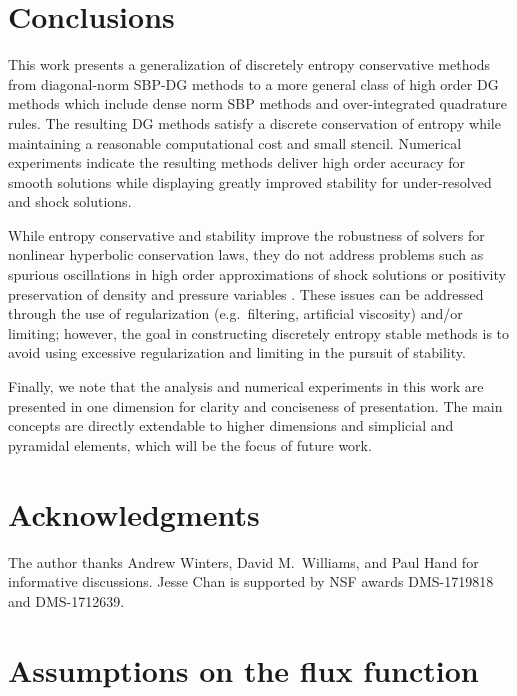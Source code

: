 \documentclass[preprint,10pt]{article}
\theoremstyle{definition}
\theoremstyle{lemma}
\theoremstyle{theorem}
\theoremstyle{assumption}
\newcommand{\LRp}[1]{\left( #1 \right)}
\newcommand{\note}[1]{{\color{blue}{#1}}}
\begin{document}
\section{Conclusions}

This work presents a generalization of discretely entropy conservative methods from diagonal-norm SBP-DG methods to a more general class of high order DG methods which include dense norm SBP methods and over-integrated quadrature rules.  The resulting DG methods satisfy a discrete conservation of entropy while maintaining a reasonable computational cost and small stencil.  Numerical experiments indicate the resulting methods deliver high order accuracy for smooth solutions while displaying greatly improved stability for under-resolved and shock solutions.  

While entropy conservative and stability improve the robustness of solvers for nonlinear hyperbolic conservation laws, they do not address problems such as spurious oscillations in high order approximations of shock solutions or positivity preservation of density and pressure variables \cite{chen2017entropy}.  These issues can be addressed through the use of regularization (e.g.\ filtering, artificial viscosity) and/or limiting; however, the goal in constructing discretely entropy stable methods is to avoid using excessive regularization and limiting in the pursuit of stability.  

Finally, we note that the analysis and numerical experiments in this work are presented in one dimension for clarity and conciseness of presentation.  The main concepts are directly extendable to higher dimensions and simplicial and pyramidal elements, which will be the focus of future work.  


\section{Acknowledgments}

The author thanks Andrew Winters, David M.\ Williams, and Paul Hand for informative discussions.  Jesse Chan is supported by NSF awards DMS-1719818 and DMS-1712639.  

\appendix
\section{Assumptions on the flux function}
\label{appendix:A}
\end{document}

